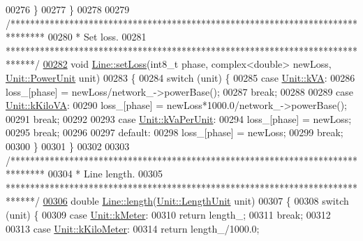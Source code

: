 \begin{DoxyCode}
00276   \}
00277 \}
00278 
00279 \textcolor{comment}{/*******************************************************************************}
00280 \textcolor{comment}{ * Set loss.}
00281 \textcolor{comment}{ ******************************************************************************/}
\hypertarget{line_8cpp_source_l00282}{}\hyperlink{group___models_gaf154792ce92a49027384b29de75373b9}{00282} \textcolor{keywordtype}{void} \hyperlink{group___models_gaf154792ce92a49027384b29de75373b9}{Line::setLoss}(int8\_t phase, complex<double> newLoss, 
      \hyperlink{class_unit_ace265ae255370ccacfd5370337572c3b}{Unit::PowerUnit} unit)
00283 \{
00284   \textcolor{keywordflow}{switch} (unit) \{
00285   \textcolor{keywordflow}{case} \hyperlink{class_unit_ace265ae255370ccacfd5370337572c3ba72b181a842ae2759488a2fa1410d3696}{Unit::kVA}:
00286     loss\_[phase] = newLoss/network\_->powerBase();
00287     \textcolor{keywordflow}{break};
00288 
00289   \textcolor{keywordflow}{case} \hyperlink{class_unit_ace265ae255370ccacfd5370337572c3bac9e5154522fbb810d7aed75c3ff47cb2}{Unit::kKiloVA}:
00290     loss\_[phase] = newLoss*1000.0/network\_->powerBase();
00291     \textcolor{keywordflow}{break};
00292 
00293   \textcolor{keywordflow}{case} \hyperlink{class_unit_ace265ae255370ccacfd5370337572c3bae056e80d620a87c61a44c359e6b05cc1}{Unit::kVaPerUnit}:
00294     loss\_[phase] = newLoss;
00295     \textcolor{keywordflow}{break};
00296 
00297   \textcolor{keywordflow}{default}:
00298     loss\_[phase] = newLoss;
00299     \textcolor{keywordflow}{break};
00300   \}
00301 \}
00302 
00303 \textcolor{comment}{/*******************************************************************************}
00304 \textcolor{comment}{ * Line length.}
00305 \textcolor{comment}{ ******************************************************************************/}
\hypertarget{line_8cpp_source_l00306}{}\hyperlink{group___models_gae2e4500d0fa60dcc2ecb08b2c96954f9}{00306} \textcolor{keywordtype}{double} \hyperlink{group___models_gae2e4500d0fa60dcc2ecb08b2c96954f9}{Line::length}(\hyperlink{class_unit_a8c8921f7b225ad6063b1cb573425b9a0}{Unit::LengthUnit} unit)
00307 \{
00308   \textcolor{keywordflow}{switch} (unit) \{
00309   \textcolor{keywordflow}{case} \hyperlink{class_unit_a8c8921f7b225ad6063b1cb573425b9a0abfa41ebe7ee649a1f02c9b8ae570434b}{Unit::kMeter}:
00310     \textcolor{keywordflow}{return} length\_;
00311     \textcolor{keywordflow}{break};
00312 
00313   \textcolor{keywordflow}{case} \hyperlink{class_unit_a8c8921f7b225ad6063b1cb573425b9a0a1c04f3dd196dbe1832a2658215b0d919}{Unit::kKiloMeter}:
00314     \textcolor{keywordflow}{return} length\_/1000.0;

\end{DoxyCode}
